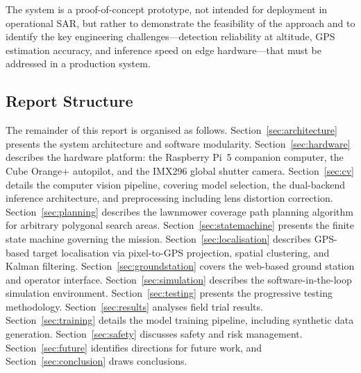 The system is a proof-of-concept prototype, not intended for deployment in operational SAR, but rather to demonstrate the feasibility of the approach and to identify the key engineering challenges---detection reliability at altitude, GPS estimation accuracy, and inference speed on edge hardware---that must be addressed in a production system.

\subsection{Report Structure}\label{sec:report-structure}

The remainder of this report is organised as follows. Section~\ref{sec:architecture} presents the system architecture and software modularity. Section~\ref{sec:hardware} describes the hardware platform: the Raspberry Pi~5 companion computer, the Cube Orange+ autopilot, and the IMX296 global shutter camera. Section~\ref{sec:cv} details the computer vision pipeline, covering model selection, the dual-backend inference architecture, and preprocessing including lens distortion correction. Section~\ref{sec:planning} describes the lawnmower coverage path planning algorithm for arbitrary polygonal search areas. Section~\ref{sec:statemachine} presents the finite state machine governing the mission. Section~\ref{sec:localisation} describes GPS-based target localisation via pixel-to-GPS projection, spatial clustering, and Kalman filtering. Section~\ref{sec:groundstation} covers the web-based ground station and operator interface. Section~\ref{sec:simulation} describes the software-in-the-loop simulation environment. Section~\ref{sec:testing} presents the progressive testing methodology. Section~\ref{sec:results} analyses field trial results. Section~\ref{sec:training} details the model training pipeline, including synthetic data generation. Section~\ref{sec:safety} discusses safety and risk management. Section~\ref{sec:future} identifies directions for future work, and Section~\ref{sec:conclusion} draws conclusions.
